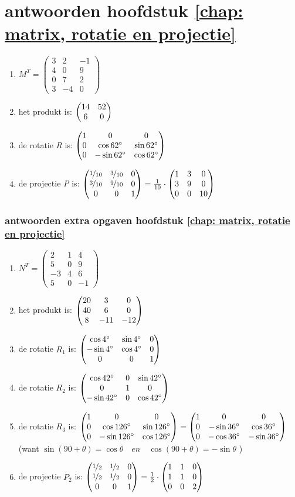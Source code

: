 \section{antwoorden  hoofdstuk \ref{chap: matrix, rotatie en projectie}}
\begin{enumerate}
	\item  
	$ M^{T} =	\begin{pmatrix}
	3 & 2 & -1\\
	4&0&9\\
	0&7&2\\
	3&-4&0 
	\end{pmatrix} $
	\item
	het produkt is:  $ \begin{pmatrix} 14&52 \\ 6&0 \end{pmatrix}  $
	\item
	de rotatie \textit{R} is:  
	$ \begin{pmatrix} 1&0&0 \\ 0&\cos  62 \degree  & \sin 62 \degree \\ 0& -\sin 62 \degree & \cos 62 \degree \end{pmatrix}  $
	\item
	de projectie \textit{P} is:  
	$ \begin{pmatrix} \nicefrac{1}{10}&\nicefrac{3}{10}&0 \\ \nicefrac{3}{10}&\nicefrac{9}{10}  & 0 \\ 0& 0 & 1 \end{pmatrix}  
	= \frac{1}{10} \cdot\begin{pmatrix} 1&3&0 \\ 3&9  & 0 \\ 0& 0 & 10 \end{pmatrix} $    
	
\end{enumerate}

\subsubsection{antwoorden extra opgaven hoofdstuk \ref{chap: matrix, rotatie en projectie}}
\begin{enumerate}
	\item
	$ N^{T} =	\begin{pmatrix}
	2 & 1 & 4\\
	5&0&9\\
	-3&4&6\\
	5&0&-1 
	\end{pmatrix} $
	\item
	het produkt is:  
	$ \begin{pmatrix} 20&3&0 \\ 40&6&0 \\ 8&-11&-12 \end{pmatrix} $
	\item    de rotatie   \textit{$ R_1  $}  is:  
	$ \begin{pmatrix} \cos  4 \degree  & \sin 4 \degree &0 \\  -\sin 4 \degree & \cos 4 \degree&0 \\ 0&0&1 \end{pmatrix} $
	\item de rotatie   \textit{$ R_2  $}  is:  
	$ \begin{pmatrix} \cos  42 \degree  & 0& \sin 42 \degree  \\ 0&1&0 \\  -\sin 42\degree &  0 &\cos 42 \degree \end{pmatrix} 
	$
	\item     de rotatie \textit{$ R_3  $} is:  
	$ \begin{pmatrix} 1&0&0 \\ 0&\cos  126 \degree  & \sin 126 \degree \\ 0& -\sin 126 \degree & \cos 126 \degree \end{pmatrix}  
	= \begin{pmatrix} 1&0&0 \\ 0&-\sin  36 \degree  & \cos 36 \degree \\ 0& -\cos 36 \degree & -\sin 36 \degree \end{pmatrix}  $ \\
	(want $ \sin(90+\theta)  = \cos \theta \quad en \quad \cos(90+\theta)  = -\sin \theta $ )
	\item   de projectie \textit{ $ P_2 $ } is:  
	$ \begin{pmatrix} \nicefrac{1}{2}&\nicefrac{1}{2}&0 \\ \nicefrac{1}{2}&\nicefrac{1}{2}  & 0 \\ 0& 0 & 1 \end{pmatrix}  
	= \frac{1}{2} \cdot\begin{pmatrix} 1&1&0 \\ 1&1  & 0 \\ 0& 0 & 2 \end{pmatrix} $    
	
\end{enumerate}

